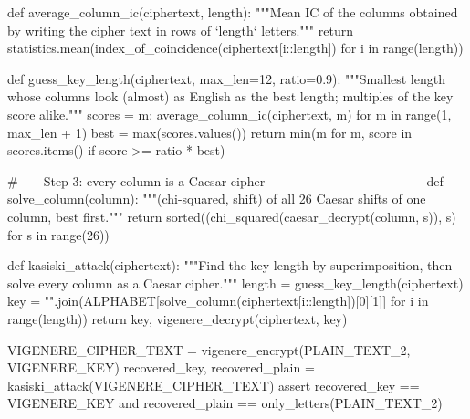 \documentclass[a4paper, 10pt]{article}
\begin{document}
\begin{problem}
\begin{subproblems_alpha}
\begin{solution}
\begin{codingbox*}[language=Python]
def average_column_ic(ciphertext, length):
    """Mean IC of the columns obtained by writing the cipher text in rows of `length` letters."""
    return statistics.mean(index_of_coincidence(ciphertext[i::length]) for i in range(length))


def guess_key_length(ciphertext, max_len=12, ratio=0.9):
    """Smallest length whose columns look (almost) as English as the best length; multiples of the key score alike."""
    scores = {m: average_column_ic(ciphertext, m) for m in range(1, max_len + 1)}
    best = max(scores.values())
    return min(m for m, score in scores.items() if score >= ratio * best)


# ---- Step 3: every column is a Caesar cipher ------------------------------------
def solve_column(column):
    """(chi-squared, shift) of all 26 Caesar shifts of one column, best first."""
    return sorted((chi_squared(caesar_decrypt(column, s)), s) for s in range(26))


def kasiski_attack(ciphertext):
    """Find the key length by superimposition, then solve every column as a Caesar cipher."""
    length = guess_key_length(ciphertext)
    key = "".join(ALPHABET[solve_column(ciphertext[i::length])[0][1]] for i in range(length))
    return key, vigenere_decrypt(ciphertext, key)


VIGENERE_CIPHER_TEXT = vigenere_encrypt(PLAIN_TEXT_2, VIGENERE_KEY)
recovered_key, recovered_plain = kasiski_attack(VIGENERE_CIPHER_TEXT)
assert recovered_key == VIGENERE_KEY and recovered_plain == only_letters(PLAIN_TEXT_2)
\end{codingbox*}
	      \end{solution}
\end{subproblems_alpha}
\end{problem}
\end{document}
